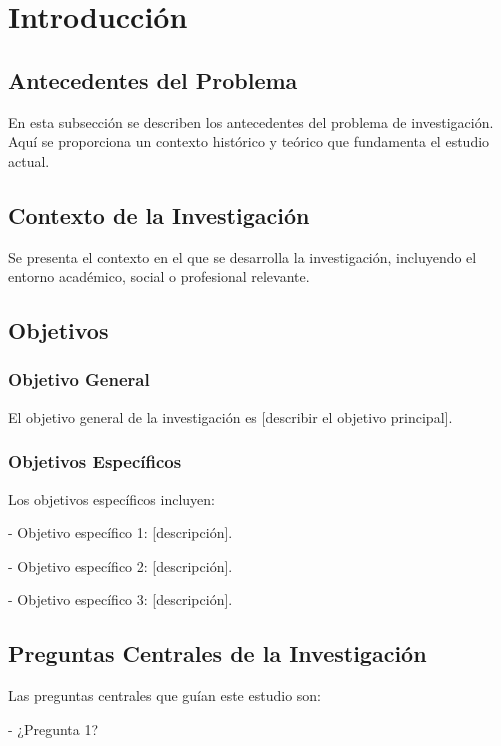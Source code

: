 \section{Introducción}
\label{sec:introduccion}

\subsection{Antecedentes del Problema}

En esta subsección se describen los antecedentes del problema de investigación. Aquí se proporciona un contexto histórico y teórico que fundamenta el estudio actual.

\subsection{Contexto de la Investigación}

Se presenta el contexto en el que se desarrolla la investigación, incluyendo el entorno académico, social o profesional relevante.

\subsection{Objetivos}

\subsubsection{Objetivo General}

El objetivo general de la investigación es [describir el objetivo principal].

\subsubsection{Objetivos Específicos}

Los objetivos específicos incluyen:

- Objetivo específico 1: [descripción].

- Objetivo específico 2: [descripción].

- Objetivo específico 3: [descripción].

\subsection{Preguntas Centrales de la Investigación}

Las preguntas centrales que guían este estudio son:

- ¿Pregunta 1?

